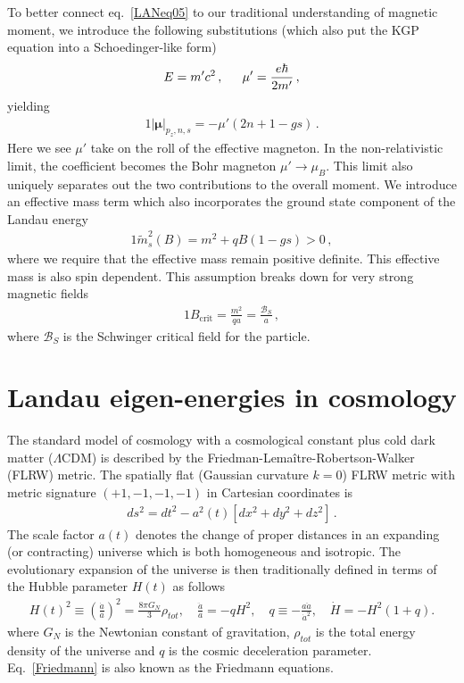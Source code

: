 \documentclass[
aps,
pra,
showpacs,
preprintnumbers,
amsmath,
amssymb,
footinbib
]{revtex4-2}
\newcommand*{\req}[1]{Eq.~{\eqref{#1}}}
\begin{document}
To better connect eq.~\eqref{LANeq05} to our traditional understanding of magnetic moment, we introduce the following substitutions (which also put the KGP equation into a Schoedinger-like form) 
\begin{alignat}{1}
  \label{LANeq06} E = m'c^{2}\,,\indent \mu'=\frac{e\hbar}{2m'}\,,
\end{alignat}
yielding
\begin{alignat}{1}
  \label{LANeq07} \left|\boldsymbol{\mu}\right|_{p_{z},n,s}=-\mu'(2n+1-gs)\,.
\end{alignat}
Here we see $\mu'$ take on the roll of the effective magneton. In the non-relativistic limit, the coefficient becomes the Bohr magneton $\mu'\rightarrow\mu_{B}$. This limit also uniquely separates out the two contributions to the overall moment. We introduce an effective mass term which also incorporates the ground state component of the Landau energy
\begin{alignat}{1}
    \label{EffectiveMass} \tilde{m}^{2}_{s}(B)=m^{2}+qB(1-gs)>0\,,
\end{alignat}
where we require that the effective mass remain positive definite. This effective mass is also spin dependent. This assumption breaks down for very strong magnetic fields
\begin{alignat}{1}
    \label{BBreak} B_{\mathrm{crit}}=\frac{m^{2}}{qa}=\frac{\mathcal{B}_{S}}{a}\,,
\end{alignat}
where $\mathcal{B}_{S}$ is the Schwinger critical field for the particle.

\section{Landau eigen-energies in cosmology}
\noindent The standard model of cosmology with a cosmological constant plus cold dark matter ($\Lambda\mathrm{CDM}$) is described by the Friedman-Lemaître-Robertson-Walker (FLRW) metric. The spatially flat (Gaussian curvature $k=0$) FLRW metric with metric signature $(+1,-1,-1,-1)$ in Cartesian coordinates is
\begin{align}
    \label{FLRW} ds^2=dt^2-a^2(t)\left[dx^2+dy^2+dz^2\right]\,.
\end{align}
The scale factor $a(t)$ denotes the change of proper distances in an expanding (or contracting) universe which is both homogeneous and isotropic. The evolutionary expansion of the universe is then traditionally defined in terms of the Hubble parameter $H(t)$ as follows
\begin{align}
  \label{Friedmann} H(t)^{2}\equiv\left(\frac{\dot a}{a}\right)^2=\frac{8\pi G_{N}}{3}\rho_{tot},\quad \frac{\ddot a}{a}=-qH^2,\quad 
q\equiv -\frac{a\ddot a}{\dot a^2},\quad \dot H=-H^2(1+q).
\end{align}
where $G_N$ is the Newtonian constant of gravitation, $\rho_{tot}$ is the total energy density of the universe and $q$ is the cosmic deceleration parameter. \req{Friedmann} is also known as the Friedmann equations. 
\end{document}

